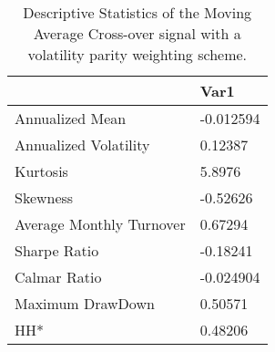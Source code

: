 \begin{table}[H]
\centering
\begin{tabular}{ll}
\hline& Var1 \\ 
\hline 
Annualized Mean & -0.012594 \\ 
Annualized Volatility & 0.12387 \\ 
Kurtosis & 5.8976 \\ 
Skewness & -0.52626 \\ 
Average Monthly Turnover & 0.67294 \\ 
Sharpe Ratio & -0.18241 \\ 
Calmar Ratio & -0.024904 \\ 
Maximum DrawDown & 0.50571 \\ 
HH* & 0.48206 \\ 
\hline
\end{tabular}
\caption{Descriptive Statistics of the Moving Average Cross-over signal with a volatility parity weighting scheme.}
\label{MAVP}
\end{table}